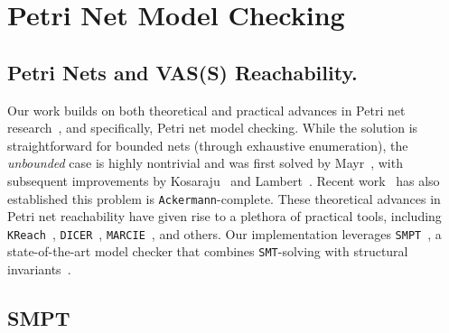 

\section{Petri Net Model Checking}
\label{appendix:smpt}


\subsection{Petri Nets and VAS(S) Reachability.}
	
	Our work builds on both theoretical and practical advances in 
	Petri net research~\cite{Mu89, Es96, Re12, EsNi24}, and specifically, Petri net model checking.
	While the solution is 
	straightforward for bounded nets (through exhaustive enumeration), the \textit{unbounded} case is highly nontrivial and was first solved by 
	Mayr~\cite{Ma81}, with subsequent improvements by Kosaraju~\cite{Ko82} and 
	Lambert~\cite{La92}. Recent work~\cite{CzWo22} has also established this 
	problem is \texttt{Ackermann}-complete.
	These theoretical advances in Petri net reachability have given rise to a 
	plethora of practical tools, including \texttt{KReach}~\cite{DiLa20}, 
	\texttt{DICER}~\cite{XiZhLi21}, \texttt{MARCIE}~\cite{HeRoSc13}, and others. 
	Our implementation leverages \texttt{SMPT}~\cite{AmDa23}, a state-of-the-art model checker that combines \texttt{SMT}-solving with structural invariants~\cite{AmBeDa21,AmDaHu22}.
	
	
\subsection{SMPT}


